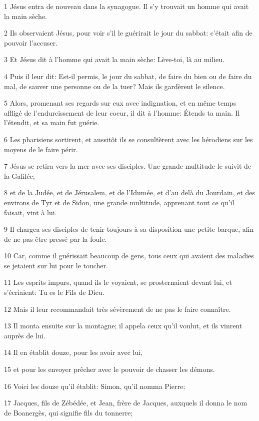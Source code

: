 \par 1 Jésus entra de nouveau dans la synagogue. Il s'y trouvait un homme qui avait la main sèche.
\par 2 Ils observaient Jésus, pour voir s'il le guérirait le jour du sabbat: c'était afin de pouvoir l'accuser.
\par 3 Et Jésus dit à l'homme qui avait la main sèche: Lève-toi, là au milieu.
\par 4 Puis il leur dit: Est-il permis, le jour du sabbat, de faire du bien ou de faire du mal, de sauver une personne ou de la tuer? Mais ils gardèrent le silence.
\par 5 Alors, promenant ses regards sur eux avec indignation, et en même temps affligé de l'endurcissement de leur coeur, il dit à l'homme: Étends ta main. Il l'étendit, et sa main fut guérie.
\par 6 Les pharisiens sortirent, et aussitôt ils se consultèrent avec les hérodiens sur les moyens de le faire périr.
\par 7 Jésus se retira vers la mer avec ses disciples. Une grande multitude le suivit de la Galilée;
\par 8 et de la Judée, et de Jérusalem, et de l'Idumée, et d'au delà du Jourdain, et des environs de Tyr et de Sidon, une grande multitude, apprenant tout ce qu'il faisait, vint à lui.
\par 9 Il chargea ses disciples de tenir toujours à sa disposition une petite barque, afin de ne pas être pressé par la foule.
\par 10 Car, comme il guérissait beaucoup de gens, tous ceux qui avaient des maladies se jetaient sur lui pour le toucher.
\par 11 Les esprits impurs, quand ils le voyaient, se prosternaient devant lui, et s'écriaient: Tu es le Fils de Dieu.
\par 12 Mais il leur recommandait très sévèrement de ne pas le faire connaître.
\par 13 Il monta ensuite sur la montagne; il appela ceux qu'il voulut, et ils vinrent auprès de lui.
\par 14 Il en établit douze, pour les avoir avec lui,
\par 15 et pour les envoyer prêcher avec le pouvoir de chasser les démons.
\par 16 Voici les douze qu'il établit: Simon, qu'il nomma Pierre;
\par 17 Jacques, fils de Zébédée, et Jean, frère de Jacques, auxquels il donna le nom de Boanergès, qui signifie fils du tonnerre;
